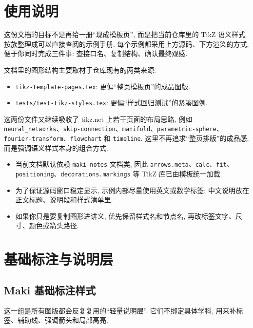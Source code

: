 \documentclass[a4paper,12pt,oneside]{maki-notes}
\begin{document}
\frontmatter
\MakeTitlePage

\chapter*{使用说明}
这份文档的目标不是再给一册“现成模板页”, 而是把当前仓库里的 TikZ 语义样式按族整理成可以直接查阅的示例手册. 每个示例都采用上方源码、下方渲染的方式, 便于你同时完成三件事: 查接口名、复制结构、确认最终观感.

文档里的图形结构主要取材于仓库现有的两类来源:
\begin{itemize}
\item \texttt{tikz-template-pages.tex}: 更偏“整页模板页”的成品图版.
\item \texttt{tests/test-tikz-styles.tex}: 更偏“样式回归测试”的紧凑图例.
\end{itemize}
这两份文件又继续吸收了 tikz.net 上若干页面的布局思路, 例如 \texttt{neural\_networks}、\texttt{skip-connection}、\texttt{manifold}、\texttt{parametric-sphere}、\texttt{fourier-transform}、\texttt{flowchart} 和 \texttt{timeline}. 这里不再追求“整页排版”的成品感, 而是强调语义样式本身的组合方式.

\begin{styleinventory}
\begin{itemize}
\item 当前文档默认依赖 \texttt{maki-notes} 文档类, 因此 \texttt{arrows.meta}、\texttt{calc}、\texttt{fit}、\texttt{positioning}、\texttt{decorations.markings} 等 TikZ 库已由模板统一加载.
\item 为了保证源码窗口稳定显示, 示例内部尽量使用英文或数学标签; 中文说明放在正文标题、说明段和样式清单里.
\item 如果你只是要复制图形进讲义, 优先保留样式名和节点名, 再改标签文字、尺寸、颜色或箭头路径.
\end{itemize}
\end{styleinventory}

\tableofcontents

\mainmatter

\chapter{基础标注与说明层}

\section{Maki 基础标注样式}

这一组是所有图版都会反复复用的“轻量说明层”. 它们不绑定具体学科, 用来补标签、辅助线、强调箭头和局部高亮.
\end{document}
